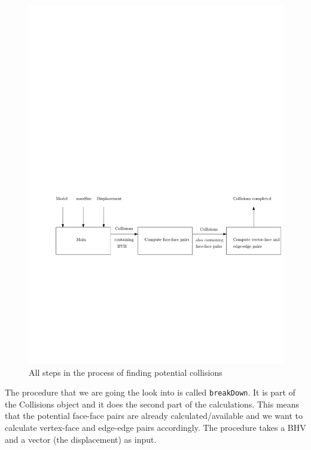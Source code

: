 \begin{figure}
	\includegraphics[width=\textwidth]{process.pdf}
	\caption{All steps in the process of finding potential collisions}
	\label{fig:process}
\end{figure}

The procedure that we are going the look into is called \texttt{breakDown}. It is part of the Collisions object and it does the second part of the calculations. This means that the potential face-face pairs are already calculated/available and we want to calculate vertex-face and edge-edge pairs accordingly. The procedure takes a BHV and a vector (the displacement) as input. 

